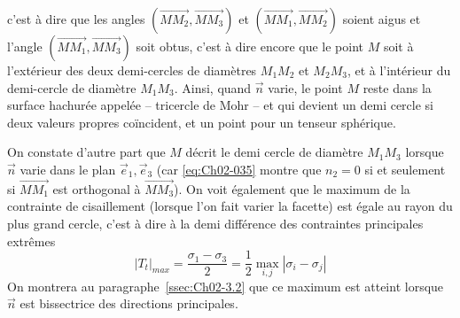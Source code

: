 c'est à dire que les angles $\left( \vec{MM_2},\vec{MM_3} \right)$ et  $\left( \vec{MM_1},\vec{MM_2} \right)$ soient aigus et l'angle $\left( \vec{MM_1}, \vec{MM_3} \right)$ soit obtus, c'est à dire encore que le point $M$ soit à l'extérieur des deux demi-cercles de diamètres $M_1M_2$ et $M_2M_3$, et à l'intérieur du demi-cercle de diamètre $M_1M_3$.
Ainsi, quand $\vec{n}$ varie, le point $M$ reste dans la surface hachurée appelée -- tricercle de Mohr -- et qui devient un demi cercle si deux va­leurs propres coïncident, et un point pour un tenseur sphérique.

On constate d'autre part que $M$ décrit le demi cercle de diamètre $M_1M_3$ lorsque $\vec{n}$ varie dans le plan $\vec{e}_1, \vec{e}_3$ (car \eqref{eq:Ch02-035} montre que $n_2 = 0$  si et seulement si $\vec{MM_1}$ est orthogonal à $\vec{MM_3}$).
On voit également que le maximum de la contrainte de cisaillement (lorsque l'on fait varier la facette) est égale au rayon du plus grand cercle, c'est à dire à la demi différence des contraintes principales extrêmes
\begin{equation}
    |T_t|_{max} = \frac{\sigma_1 - \sigma_3}{2} = \frac{1}{2} \max_{i,j} |\sigma_i - \sigma_j|
    \label{eq:Ch02-039}
\end{equation}
On montrera au paragraphe~\ref{ssec:Ch02-3.2} que ce maximum est atteint lorsque $\vec{n}$ est bissectrice des directions principales.  

